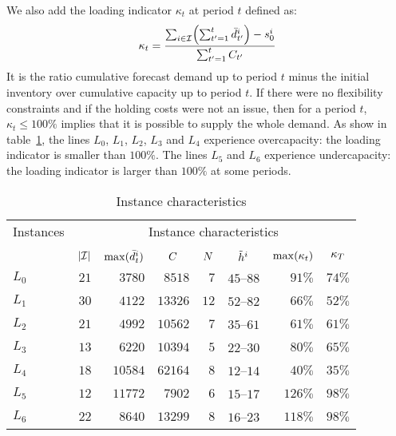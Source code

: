 We also add the loading indicator $\kappa_t$ at period $t$ defined as:
\begin{equation}
  \kappa_t = \frac{\sum_{i\in\REF} \bracket{\sum_{t'=1}^{t} \bar{\demand}_{t'}^i}-\inventory_0^i}{ \sum_{t'=1}^{t} \capacity_{t'}}
\end{equation}
It is the ratio cumulative forecast demand up to period $t$ minus the initial inventory over cumulative capacity up to period $t$. If there were no flexibility constraints and if the holding costs were not an issue, then for a period $t$, $\kappa_t \le 100\%$ implies that it is possible to supply the whole demand. As show in table~\ref{tab:instances-characteristics}, the lines $L_0$, $L_1$, $L_2$, $L_3$ and $L_4$ experience overcapacity: the loading indicator is smaller than $100\%$. The lines $L_5$ and $L_6$ experience undercapacity: the loading indicator is larger than $100\%$ at some periods.

\begin{table}[ht]
\begin{center}
\begin{tabular*}{\linewidth}{@{\extracolsep{\fill}}lrrrrrrr@{\extracolsep{\fill}}}
\hline
Instances &
\multicolumn{7}{c}{Instance characteristics}
\\\cline{2-8}
\\
& $\card{\REF}$
& $\max(\bar{d}_t^i)$
& \multicolumn{1}{c}{$C$}
& \multicolumn{1}{c}{$N$}
& \multicolumn{1}{c}{$\tilde{h}^i$}
& \multicolumn{1}{c}{$\max\bracket{\kappa_t}$}
& \multicolumn{1}{c}{$\kappa_{T}$}
\\\hline
$L_0$ & $21$ & $3780$ & $8518$ & $7$ & $45$--$88$ & $91\%$ & $74\%$
\\
$L_1$ & $30$ & $4122$ & $13326$ & $12$ & $52$--$82$ & $66\%$ & $52\%$
\\
$L_2$ & $21$ & $4992$ & $10562$ & $7$ & $35$--$61$ & $61\%$ & $61\%$
\\
$L_3$ & $13$ & $6220$ & $10394$ & $5$ & $22$--$30$ & $80\%$ & $65\%$
\\
$L_4$ & $18$ & $10584$ & $62164$ & $8$ & $12$--$14$ & $40\%$ & $35\%$
\\
$L_5$ & $12$ & $11772$ & $7902$ & $6$ & $15$--$17$ & $126\%$ & $98\%$
\\
$L_6$ & $22$ & $8640$ & $13299$ & $8$ & $16$--$23$ & $118\%$ & $98\%$
\\\hline
\end{tabular*}
\caption{Instance characteristics}
\label{tab:instances-characteristics}
\end{center}
\end{table}

